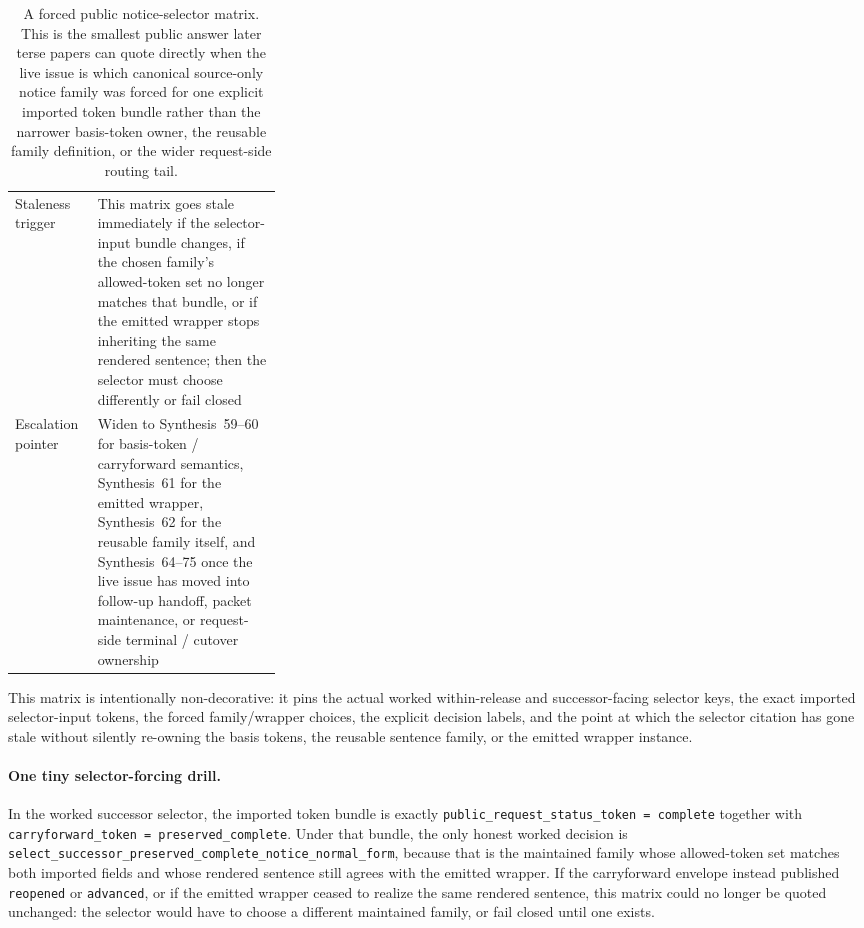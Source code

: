 \documentclass[11pt]{article}
\begin{document}
\begin{table}[t]
\begin{tabularx}{0.97\linewidth}{@{}p{0.31\linewidth}X@{}}
Staleness trigger & This matrix goes stale immediately if the selector-input bundle changes, if the chosen family's allowed-token set no longer matches that bundle, or if the emitted wrapper stops inheriting the same rendered sentence; then the selector must choose differently or fail closed \\
Escalation pointer & Widen to Synthesis~59--60 for basis-token / carryforward semantics, Synthesis~61 for the emitted wrapper, Synthesis~62 for the reusable family itself, and Synthesis~64--75 once the live issue has moved into follow-up handoff, packet maintenance, or request-side terminal / cutover ownership \\
\bottomrule
\end{tabularx}
\caption{A forced public notice-selector matrix. This is the smallest public answer later terse papers can quote directly when the live issue is which canonical source-only notice family was forced for one explicit imported token bundle rather than the narrower basis-token owner, the reusable family definition, or the wider request-side routing tail.}
\label{tab:forced-public-notice-selector-matrix}
\end{table}

This matrix is intentionally non-decorative: it pins the actual worked within-release and successor-facing selector keys, the exact imported selector-input tokens, the forced family/wrapper choices, the explicit decision labels, and the point at which the selector citation has gone stale without silently re-owning the basis tokens, the reusable sentence family, or the emitted wrapper instance.\cite{series:workedexample}

\paragraph{One tiny selector-forcing drill.}
In the worked successor selector, the imported token bundle is exactly \texttt{public\_request\_status\_token = complete} together with \texttt{carryforward\_token = preserved\_complete}. Under that bundle, the only honest worked decision is \texttt{select\_successor\_preserved\_complete\_notice\_normal\_form}, because that is the maintained family whose allowed-token set matches both imported fields and whose rendered sentence still agrees with the emitted wrapper. If the carryforward envelope instead published \texttt{reopened} or \texttt{advanced}, or if the emitted wrapper ceased to realize the same rendered sentence, this matrix could no longer be quoted unchanged: the selector would have to choose a different maintained family, or fail closed until one exists.\cite{series:workedexample}
\end{document}

